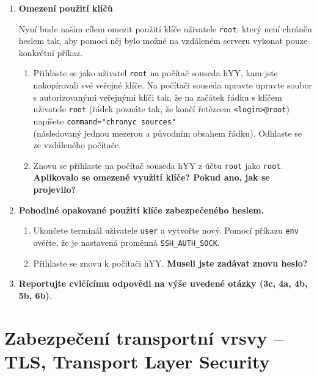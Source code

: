 \documentclass[a4paper,11pt]{article}
\begin{document}
\begin{enumerate}
\begin{enumerate}
    \end{enumerate}

  \item {\bf Omezení použití klíčů}

    Nyní bude naším cílem omezit použití klíče uživatele {\tt root}, který není chráněn heslem tak,
    aby pomocí něj bylo možné na vzdáleném serveru vykonat pouze konkrétní příkaz.

    \begin{enumerate}

      \item Přihlaste se jako uživatel {\tt root} na počítač souseda hYY, kam jste nakopírovali své veřejné klíče. Na počítači souseda upravte
        upravte soubor s autorizovanými veřejnými klíči tak, že na začátek
        řádku s klíčem uživatele {\tt root} (řádek poznáte tak, že končí řetězcem
        {\tt <login>@root}) napíšete
        \verb|command="chronyc sources" | \\ (následovaný jednou mezerou a původním
        obsahem řádku).
        Odhlaste se ze vzdáleného počítače.

      \item Znovu se přihlaste na počítač souseda hYY z
        účtu {\tt root} jako {\tt root}.  {\bf Aplikovalo se
        omezené využití klíče? Pokud ano, jak se projevilo?}

    \end{enumerate}


  \item {\bf Pohodlné opakované použití klíče zabezpečeného heslem.}

    \begin{enumerate}

      \item Ukončete terminál uživatele {\tt user} a vytvořte nový. Pomocí
        příkazu \verb|env| ověřte, že je nastavená proměnná
        \verb|SSH_AUTH_SOCK|.

      \item Přihlaste se znovu k počítači hYY. {\bf Museli jste zadávat znovu heslo?}

    \end{enumerate}
  \item {\bf Reportujte cvičícímu odpovědi na výše uvedené otázky (3c, 4a, 4b,
    5b, 6b)}.

\end{enumerate}

\section{Zabezpečení transportní vrsvy -- TLS, Transport Layer Security}
\end{document}
